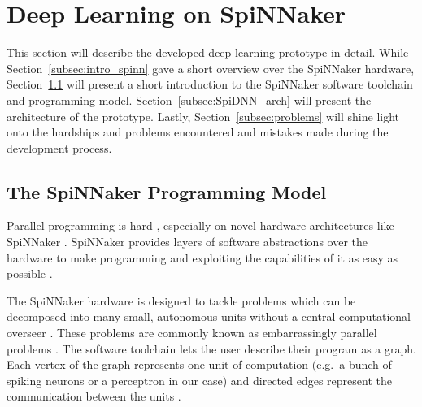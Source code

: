 \documentclass[]{article}
\begin{document}


\section{Deep Learning on SpiNNaker} %
\label{sec:SpiDNN}

This section will describe the developed deep learning prototype in
detail.
While Section~\ref{subsec:intro_spinn} gave a short overview over the
SpiNNaker hardware, Section~\ref{subsec:spinn_toolchain} will present
a short introduction to the SpiNNaker software toolchain and
programming model.
Section~\ref{subsec:SpiDNN_arch} will present the architecture of the
prototype.
Lastly, Section~\ref{subsec:problems} will shine light onto the
hardships and problems encountered and mistakes made during the
development process.


\subsection{The SpiNNaker Programming Model} %
\label{subsec:spinn_toolchain}

Parallel programming is hard \citep{lee_2011}, especially on novel
hardware architectures like SpiNNaker \citep{brown_et_al_2015}.
SpiNNaker provides layers of software abstractions over the hardware
to make programming and exploiting the capabilities of it as easy as
possible \citep{furber_et_al_2020}.

The SpiNNaker hardware is designed to tackle problems which can be
decomposed into many small, autonomous units without a central
computational overseer \citep{brown_et_al_2015}.
These problems are commonly known as embarrassingly parallel problems
\citep{foster_1995}.
The software toolchain lets the user describe their program as a
graph.
Each vertex of the graph represents one unit of computation
(e.g.\ a bunch of spiking neurons or a perceptron in our case)
and directed edges represent the communication between the units
\citep{furber_et_al_2020}.
\end{document}
